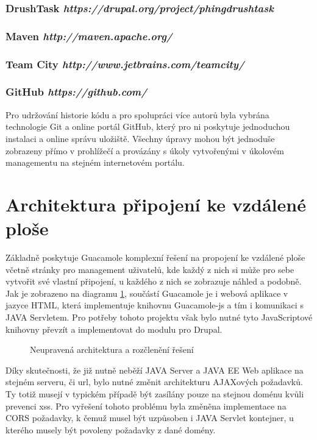 \subsubsection*{DrushTask \hfill \emph{https://drupal.org/project/phingdrushtask}}

\subsubsection*{Maven \hfill \emph{http://maven.apache.org/}}

\subsubsection*{Team City \hfill \emph{http://www.jetbrains.com/teamcity/}}

\subsubsection*{GitHub \hfill \emph{https://github.com/}}
\label{subsec:github}
Pro udržování historie kódu a pro spolupráci více autorů byla vybrána technologie Git a online portál GitHub, který pro ni poskytuje jednoduchou instalaci a online správu uložiště. Všechny úpravy mohou být jednoduše zobrazeny přímo v prohlížečí a provázány s úkoly vytvořenými v úkolovém managementu na stejném internetovém portálu. 

\section{Architektura připojení ke vzdálené ploše}
Základně poskytuje Guacamole komplexní řešení na propojení ke vzdálené ploše včetně stránky pro management uživatelů, kde každý z nich si může pro sebe vytvořit své vlastní připojení, u každého z nich se zobrazuje náhled a podobně. Jak je zobrazeno na diagramu \ref{fig:arch_guacamole}, součástí Guacamole je i webová aplikace v jazyce HTML, která implementuje knihovnu Guacamole-js a tím i komunikaci s JAVA Servletem. Pro potřeby tohoto projektu však bylo nutné tyto JavaScriptové knihovny převzít a implementovat do modulu pro Drupal. 

\begin{figure}[htp] 
  \caption{Neupravená architektura a rozčlenění řešení}
  \label{fig:arch_guacamole}
\end{figure}  

Díky skutečnosti, že již nutně neběží JAVA Server a JAVA EE Web aplikace na stejném serveru, či url, bylo nutné změnit architekturu AJAXových požadavků. Ty totiž musejí v typickém případě být zasílány pouze na stejnou doménu kvůli prevenci \gls{xss}. Pro vyřešení tohoto problému byla změněna implementace na CORS požadavky, k čemuž musel být uzpůsoben i JAVA Servlet kontejner, u kterého musely být povoleny požadavky z dané domény. 


